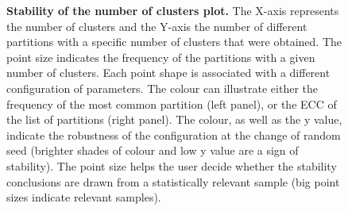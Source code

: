 \begin{figure}[H]
    \centering
    \caption{\label{fig:ca-1-knpart}\textbf{Stability of the number of clusters plot.} The X-axis represents the number of clusters and the Y-axis the number of different partitions with a specific number of clusters that were obtained. The point size indicates the frequency of the partitions with a given number of clusters. Each point shape is associated with a different configuration of parameters. The colour can illustrate either the frequency of the most common partition (left panel), or the ECC of the list of partitions (right panel). The colour, as well as the y value, indicate the robustness of the configuration at the change of random seed (brighter shades of colour and low y value are a sign of stability). The point size helps the user decide whether the stability conclusions are drawn from a statistically relevant sample (big point sizes indicate relevant samples).}
\end{figure}

